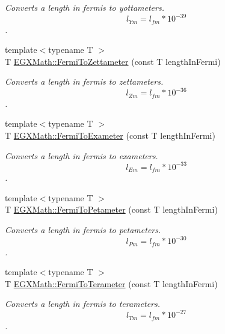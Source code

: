\begin{DoxyCompactItemize}
\begin{DoxyCompactList}\small\item\em Converts a length in fermis to yottameters. \[ l_{Ym}=l_{fm} * 10^{-39} \]. \end{DoxyCompactList}\item 
{\footnotesize template$<$typename T $>$ }\\T \mbox{\hyperlink{group___e_g_x_math-_conversions-_length_conversions-_non-_s_i-_fermi-_s_i_ga2ca47f79138a4edf88f4ffa2849ca35d}{E\+G\+X\+Math\+::\+Fermi\+To\+Zettameter}} (const T length\+In\+Fermi)
\begin{DoxyCompactList}\small\item\em Converts a length in fermis to zettameters. \[ l_{Zm}=l_{fm} * 10^{-36} \]. \end{DoxyCompactList}\item 
{\footnotesize template$<$typename T $>$ }\\T \mbox{\hyperlink{group___e_g_x_math-_conversions-_length_conversions-_non-_s_i-_fermi-_s_i_ga5070d7a2d963b8698fe00651db559941}{E\+G\+X\+Math\+::\+Fermi\+To\+Exameter}} (const T length\+In\+Fermi)
\begin{DoxyCompactList}\small\item\em Converts a length in fermis to exameters. \[ l_{Em}=l_{fm} * 10^{-33} \]. \end{DoxyCompactList}\item 
{\footnotesize template$<$typename T $>$ }\\T \mbox{\hyperlink{group___e_g_x_math-_conversions-_length_conversions-_non-_s_i-_fermi-_s_i_ga49b952393c3827f4bcf231331f2bbc3a}{E\+G\+X\+Math\+::\+Fermi\+To\+Petameter}} (const T length\+In\+Fermi)
\begin{DoxyCompactList}\small\item\em Converts a length in fermis to petameters. \[ l_{Pm}=l_{fm} * 10^{-30} \]. \end{DoxyCompactList}\item 
{\footnotesize template$<$typename T $>$ }\\T \mbox{\hyperlink{group___e_g_x_math-_conversions-_length_conversions-_non-_s_i-_fermi-_s_i_gaeec616a22461720c918d6dc60c3d7fbb}{E\+G\+X\+Math\+::\+Fermi\+To\+Terameter}} (const T length\+In\+Fermi)
\begin{DoxyCompactList}\small\item\em Converts a length in fermis to terameters. \[ l_{Tm}=l_{fm} * 10^{-27} \]. \end{DoxyCompactList}\item 

\end{DoxyCompactItemize}

